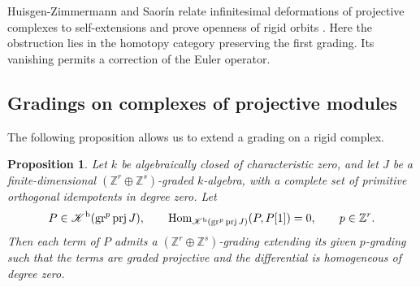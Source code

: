 \documentclass[12pt,a4paper,english,reqno]{amsart}
\theoremstyle{plain}
\newtheorem{prp}[thm]{Proposition}
\theoremstyle{definition}
\numberwithin{equation}{section}
\def\Hom{\operatorname{Hom}}
\def\prj{\operatorname{prj}}
\def\Kb{{\mathcal K}^{\text{\rm b}}}
\def\bbZ{{\mathbb Z}}
\def\ds{\oplus}
\def\gr{\operatorname{gr}}
\begin{document}
Huisgen-Zimmermann and Saor\'in relate infinitesimal deformations of projective complexes to self-extensions and prove openness of rigid orbits \cite[Theorem~7 and Corollary~8]{HZS}. Here the obstruction lies in the homotopy category preserving the first grading. Its vanishing permits a correction of the Euler operator.

\subsection{Gradings on complexes of projective modules}
The following proposition allows us to extend a grading on a rigid complex.
\begin{prp}\label{prop:finite}
Let $k$ be algebraically closed of characteristic zero, and let $J$ be a finite-dimensional $(\bbZ^r\ds\bbZ^s)$-graded $k$-algebra, with a complete set of primitive orthogonal idempotents in degree zero. Let
\[
 P\in \Kb(\gr^p\prj J),\qquad
 \Hom_{\Kb(\gr^p\prj J)}(P,P[1])=0,
 \qquad p\in\bbZ^r.
\]
Then each term of $P$ admits a $(\bbZ^r\ds\bbZ^s)$-grading extending its given $p$-grading such that the terms are graded projective and the differential is homogeneous of degree zero.
\end{prp}
\end{document}

